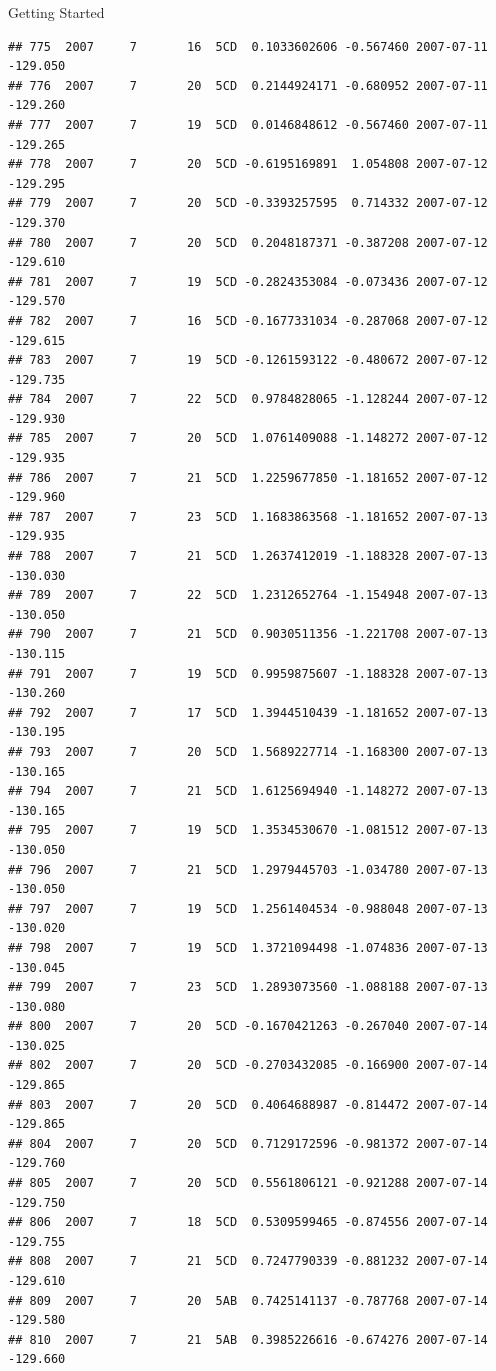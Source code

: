 \documentclass[
  ignorenonframetext,
]{beamer}
\begin{document}
\begin{frame}[fragile]{Getting Started}
\begin{verbatim}
## 775  2007     7       16  5CD  0.1033602606 -0.567460 2007-07-11 -129.050
## 776  2007     7       20  5CD  0.2144924171 -0.680952 2007-07-11 -129.260
## 777  2007     7       19  5CD  0.0146848612 -0.567460 2007-07-11 -129.265
## 778  2007     7       20  5CD -0.6195169891  1.054808 2007-07-12 -129.295
## 779  2007     7       20  5CD -0.3393257595  0.714332 2007-07-12 -129.370
## 780  2007     7       20  5CD  0.2048187371 -0.387208 2007-07-12 -129.610
## 781  2007     7       19  5CD -0.2824353084 -0.073436 2007-07-12 -129.570
## 782  2007     7       16  5CD -0.1677331034 -0.287068 2007-07-12 -129.615
## 783  2007     7       19  5CD -0.1261593122 -0.480672 2007-07-12 -129.735
## 784  2007     7       22  5CD  0.9784828065 -1.128244 2007-07-12 -129.930
## 785  2007     7       20  5CD  1.0761409088 -1.148272 2007-07-12 -129.935
## 786  2007     7       21  5CD  1.2259677850 -1.181652 2007-07-12 -129.960
## 787  2007     7       23  5CD  1.1683863568 -1.181652 2007-07-13 -129.935
## 788  2007     7       21  5CD  1.2637412019 -1.188328 2007-07-13 -130.030
## 789  2007     7       22  5CD  1.2312652764 -1.154948 2007-07-13 -130.050
## 790  2007     7       21  5CD  0.9030511356 -1.221708 2007-07-13 -130.115
## 791  2007     7       19  5CD  0.9959875607 -1.188328 2007-07-13 -130.260
## 792  2007     7       17  5CD  1.3944510439 -1.181652 2007-07-13 -130.195
## 793  2007     7       20  5CD  1.5689227714 -1.168300 2007-07-13 -130.165
## 794  2007     7       21  5CD  1.6125694940 -1.148272 2007-07-13 -130.165
## 795  2007     7       19  5CD  1.3534530670 -1.081512 2007-07-13 -130.050
## 796  2007     7       21  5CD  1.2979445703 -1.034780 2007-07-13 -130.050
## 797  2007     7       19  5CD  1.2561404534 -0.988048 2007-07-13 -130.020
## 798  2007     7       19  5CD  1.3721094498 -1.074836 2007-07-13 -130.045
## 799  2007     7       23  5CD  1.2893073560 -1.088188 2007-07-13 -130.080
## 800  2007     7       20  5CD -0.1670421263 -0.267040 2007-07-14 -130.025
## 802  2007     7       20  5CD -0.2703432085 -0.166900 2007-07-14 -129.865
## 803  2007     7       20  5CD  0.4064688987 -0.814472 2007-07-14 -129.865
## 804  2007     7       20  5CD  0.7129172596 -0.981372 2007-07-14 -129.760
## 805  2007     7       20  5CD  0.5561806121 -0.921288 2007-07-14 -129.750
## 806  2007     7       18  5CD  0.5309599465 -0.874556 2007-07-14 -129.755
## 808  2007     7       21  5CD  0.7247790339 -0.881232 2007-07-14 -129.610
## 809  2007     7       20  5AB  0.7425141137 -0.787768 2007-07-14 -129.580
## 810  2007     7       21  5AB  0.3985226616 -0.674276 2007-07-14 -129.660

\end{verbatim}
\end{frame}
\end{document}
